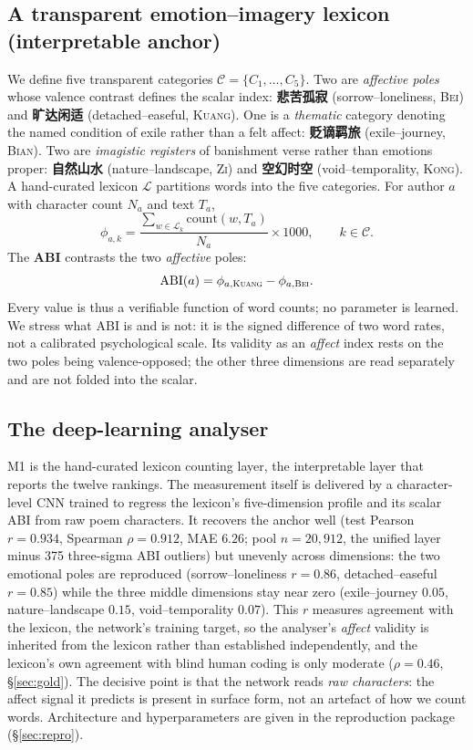 \documentclass[10pt]{article}
\begin{document}
\subsection{A transparent emotion--imagery lexicon (interpretable anchor)}
\label{sec:lexicon}
We define five transparent categories $\mathcal{C}{=}\{C_1,\dots,C_5\}$. Two are
\emph{affective poles} whose valence contrast defines the scalar index:
\textbf{悲苦孤寂} (sorrow--loneliness, \textsc{Bei}) and \textbf{旷达闲适}
(detached--easeful, \textsc{Kuang}). One is a \emph{thematic} category denoting the
named condition of exile rather than a felt affect: \textbf{贬谪羁旅} (exile--journey,
\textsc{Bian}). Two are \emph{imagistic registers} of banishment verse rather than
emotions proper: \textbf{自然山水} (nature--landscape, \textsc{Zi}) and
\textbf{空幻时空} (void--temporality, \textsc{Kong}). A hand-curated lexicon
$\mathcal{L}$ partitions words into the five categories. For author $a$ with
character count $N_a$ and text $T_a$,
\begin{equation}
\phi_{a,k} = \frac{\sum_{w\in\mathcal{L}_k}\mathrm{count}(w,T_a)}
                   {N_a}\times 1000,
\qquad k\in\mathcal{C}.
\end{equation}
The \textbf{ABI} contrasts the two \emph{affective} poles:
\begin{equation}
\mathrm{ABI}(a)=\phi_{a,\textsc{Kuang}}-\phi_{a,\textsc{Bei}}.
\end{equation}
Every value is thus a verifiable function of word counts; no parameter is learned.
We stress what ABI is and is not: it is the signed difference of two word rates,
not a calibrated psychological scale. Its validity as an \emph{affect} index rests
on the two poles being valence-opposed; the other three dimensions are read
separately and are not folded into the scalar.

\subsection{The deep-learning analyser}
\label{sec:dl}
M1 is the hand-curated lexicon counting layer, the interpretable layer that reports
the twelve rankings. The measurement itself is delivered by a character-level CNN
trained to regress the lexicon's five-dimension profile and its scalar ABI from raw
poem characters. It recovers the anchor well (test Pearson $r{=}0.934$, Spearman
$\rho{=}0.912$, MAE $6.26$; pool $n{=}20{,}912$, the unified layer minus 375
three-sigma ABI outliers) but unevenly across dimensions: the two emotional poles are
reproduced (sorrow--loneliness $r{=}0.86$, detached--easeful $r{=}0.85$) while the
three middle dimensions stay near zero (exile--journey $0.05$, nature--landscape
$0.15$, void--temporality $0.07$). This $r$ measures agreement with the lexicon, the
network's training target, so the analyser's \emph{affect} validity is inherited from
the lexicon rather than established independently, and the lexicon's own agreement
with blind human coding is only moderate ($\rho{=}0.46$, \S\ref{sec:gold}). The
decisive point is that the network reads \emph{raw characters}: the affect signal it
predicts is present in surface form, not an artefact of how we count words.
Architecture and hyperparameters are given in the reproduction package
(\S\ref{sec:repro}).
\end{document}
